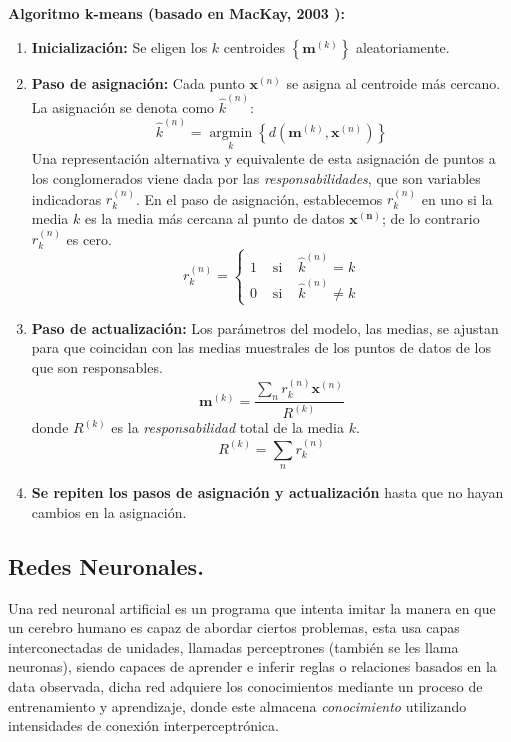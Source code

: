 \documentclass[12pt,letterpaper,oneside,openright]{book}
\begin{document}
	\textbf{Algoritmo k-means (basado en MacKay, 2003 \cite{mackay03}):}
	\begin{enumerate}
		\item \textbf{Inicialización:} 
		Se eligen los $k$ centroides $\left\{\mathbf{m}^{(k)}\right\}$ aleatoriamente.
		\item \textbf{Paso de asignación:}
		Cada punto $\mathbf{x}^{(n)}$ se asigna al centroide más cercano. La asignación se denota como $\hat{k}^{(n)}$:
		\begin{equation}
			\label{eq:k_mean_asig}
			\hat{k}^{(n)}=\underset{k}{\operatorname{argmin}}\left\{d\left(\mathbf{m}^{(k)}, \mathbf{x}^{(n)}\right)\right\}
		\end{equation}
		Una representación alternativa y equivalente de esta asignación de puntos a los conglomerados viene dada por las \textit{responsabilidades}, que son variables indicadoras $r_k^{(n)}$. En el paso de asignación, establecemos $r_k^{(n)}$ en uno si la media $k$ es la media más cercana al punto de datos $\mathbf{x^{(n)}}$; de lo contrario $r_k^{(n)}$ es cero.
		\begin{equation}
			\label{eq:cond_rk}
			r_k^{(n)}=\left\{\begin{array}{lll}
				1 & \text { si } & \hat{k}^{(n)}=k \\
				0 & \text { si } & \hat{k}^{(n)} \neq k
			\end{array}\right.
		\end{equation}
		\item \textbf{Paso de actualización:}
		Los parámetros del modelo, las medias, se ajustan para que coincidan con las medias muestrales de los puntos de datos de los que son responsables.
		\begin{equation}
			\label{eq:media_muestral}
			\mathbf{m}^{(k)}=\frac{\sum_n r_k^{(n)} \mathbf{x}^{(n)}}{R^{(k)}}
		\end{equation}
		donde $R^{(k)}$ es la \textit{responsabilidad} total de la media $k$.
		\begin{equation}
			\label{eq:rk}
			R^{(k)}=\sum_n r_k^{(n)}
		\end{equation}
		\item \textbf{Se repiten los pasos de asignación y actualización} hasta que no hayan cambios en la asignación.
	\end{enumerate}
	
\subsection{Redes Neuronales.} \label{subsec:NN}
	Una red neuronal artificial es un programa que intenta imitar la manera en que un cerebro humano es capaz de abordar ciertos problemas, esta usa capas interconectadas de unidades, llamadas perceptrones (también se les llama neuronas), siendo capaces de aprender e inferir reglas o relaciones basados en la data observada, dicha red adquiere los conocimientos mediante un proceso de entrenamiento y aprendizaje, donde este almacena \textit{conocimiento} utilizando intensidades de conexión interperceptrónica. 
\end{document}
